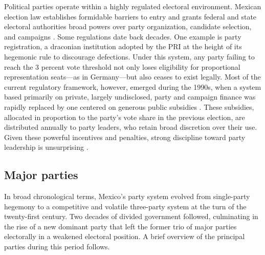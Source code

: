 \documentclass[letter,12pt]{article}
\begin{document}
Political parties operate within a highly regulated electoral environment. Mexican election law establishes formidable barriers to entry and grants federal and state electoral authorities broad powers over party organization, candidate selection, and campaigns \citep{estevez.ref2007.2007, magar.2007ref.2015}. Some regulations date back decades. One example is party registration, a draconian institution adopted by the PRI at the height of its hegemonic rule to discourage defections. Under this system, any party failing to reach the 3 percent vote threshold not only loses eligibility for proportional representation seats---as in Germany---but also ceases to exist legally. Most of the current regulatory framework, however, emerged during the 1990s, when a system based primarily on private, largely undisclosed, party and campaign finance was rapidly replaced by one centered on generous public subsidies \citep{poire.Money2005}. These subsidies, allocated in proportion to the party's vote share in the previous election, are distributed annually to party leaders, who retain broad discretion over their use. Given these powerful incentives and penalties, strong discipline toward party leadership is unsurprising \citep{weldon.1997}.

\subsection{Major parties}

In broad chronological terms, Mexico's party system evolved from single-party hegemony to a competitive and volatile three-party system at the turn of the twenty-first century. Two decades of divided government followed, culminating in the rise of a new dominant party that left the former trio of major parties electorally in a weakened electoral position. A brief overview of the principal parties during this period follows.
\end{document}
